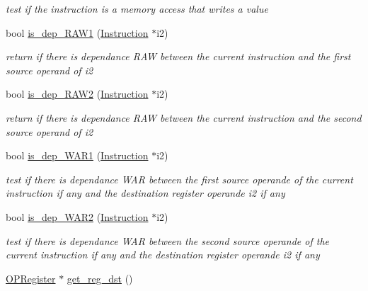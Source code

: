 \begin{DoxyCompactItemize}
\begin{DoxyCompactList}\small\item\em test if the instruction is a memory access that writes a value \end{DoxyCompactList}\item 
bool \hyperlink{class_instruction_ae5d54f535adab416c53eb0ff6a438804}{is\+\_\+dep\+\_\+\+R\+A\+W1} (\hyperlink{class_instruction}{Instruction} $\ast$i2)
\begin{DoxyCompactList}\small\item\em return if there is dependance R\+A\+W between the current instruction and the first source operand of i2 \end{DoxyCompactList}\item 
bool \hyperlink{class_instruction_aa28ae5f427ee02c96466f1ac68060f87}{is\+\_\+dep\+\_\+\+R\+A\+W2} (\hyperlink{class_instruction}{Instruction} $\ast$i2)
\begin{DoxyCompactList}\small\item\em return if there is dependance R\+A\+W between the current instruction and the second source operand of i2 \end{DoxyCompactList}\item 
bool \hyperlink{class_instruction_a36c0faedd74af14b403ba7063af5d07f}{is\+\_\+dep\+\_\+\+W\+A\+R1} (\hyperlink{class_instruction}{Instruction} $\ast$i2)
\begin{DoxyCompactList}\small\item\em test if there is dependance W\+A\+R between the first source operande of the current instruction if any and the destination register operande i2 if any \end{DoxyCompactList}\item 
bool \hyperlink{class_instruction_a04471df677984f67ec13de88f55e3703}{is\+\_\+dep\+\_\+\+W\+A\+R2} (\hyperlink{class_instruction}{Instruction} $\ast$i2)
\begin{DoxyCompactList}\small\item\em test if there is dependance W\+A\+R between the second source operande of the current instruction if any and the destination register operande i2 if any \end{DoxyCompactList}\item 
\hypertarget{class_instruction_adb43e7019987daebb3970335aba695cc}{}\hyperlink{class_o_p_register}{O\+P\+Register} $\ast$ \hyperlink{class_instruction_adb43e7019987daebb3970335aba695cc}{get\+\_\+reg\+\_\+dst} ()\label{class_instruction_adb43e7019987daebb3970335aba695cc}


\end{DoxyCompactItemize}
